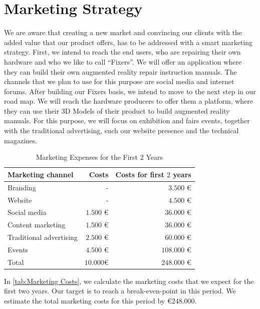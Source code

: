 \section{Marketing Strategy}
We are aware that creating a new market and convincing our clients with the added value that our product offers, has to be addressed with a smart marketing strategy. 
	First, we intend to reach the end users, who are repairing their own hardware and who we like to call “Fixers”. We will offer an application where they can build their own augmented reality repair instruction manuals. The channels that we plan to use for this purpose are social media and internet forums. After building our Fixers basis, we intend to move to the next step in our road map. 
	We will reach the hardware producers to offer them a platform, where they can use their $3$D Models of their product to build augmented reality manuals. For this purpose, we will focus on exhibition and fairs events, together with the traditional advertising, such our website presence and the technical magazines.
	\begin{table}[H]
\caption[Marketing Expenses for the First 2 Years]{Marketing Expenses for the First 2 Years}
\label{tab:Marketing Costs}
\begin{center}
\begin{tabular}{|l|r|r|}
\hline 
Marketing channel & Costs & Costs for first $2$ years \\ 
\hline 
Branding & - & $3.500$ \euro \\ 
\hline 
Website & - & $4.500$ \euro \\ 
\hline 
Social media & $1.500$ \euro & $36.000$ \euro \\ 
\hline 
Content marketing & $1.500$ \euro & $36.000$ \euro \\ 
\hline 
Traditional advertising & $2.500$ \euro & $60.000$ \euro \\ 
\hline 
Events & $4.500$ \euro & $108.000$ \euro \\ 
\hline 
Total & $10.000$\euro & $248.000$ \euro \\ 
\hline 
\end{tabular} 
\end{center}
\end{table}
In \autoref{tab:Marketing Costs}, we calculate the marketing costs that we expect for the first two years. Our target is to reach a break-even-point in this period. We estimate the total marketing costs for this period by \euro $248.000$.
